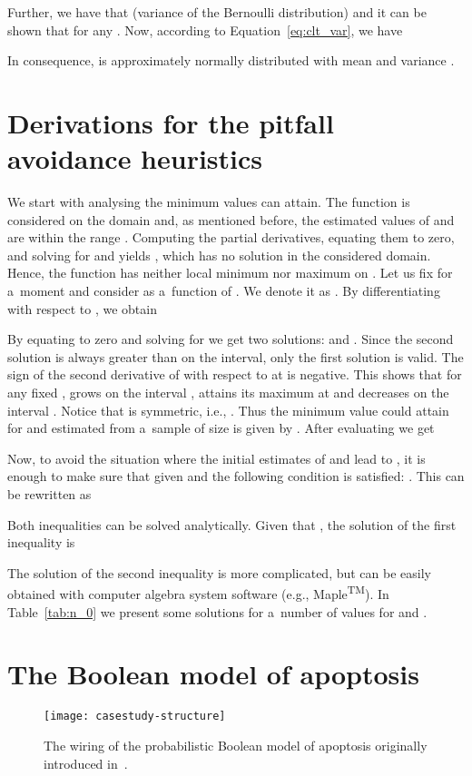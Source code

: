 \documentclass[runningheads,a4paper]{llncs}
\begin{document}
Further, we have that
 (variance of the
Bernoulli distribution) and it can be shown that
 for any . Now,
according to Equation~\eqref{eq:clt_var}, we have

In consequence,  is approximately normally distributed with mean
 and variance
.

\section{Derivations for the pitfall avoidance heuristics}
\label{app:1st_approach}

We start with analysing the minimum values  can attain. The function is considered
on the domain  and, as mentioned before, the estimated values of  and
 are within the range . Computing the partial derivatives, equating them
to zero, and solving for  and  yields , which has no solution in
the considered domain. Hence, the function has neither local minimum nor maximum on . Let us
fix  for a~moment and consider  as a~function of .
We denote it as .
By differentiating with respect to , we obtain

By equating to zero and solving for  we get two solutions:
 and
.
Since the second solution is always greater than  on the  interval, only the first
solution is valid. The sign of the second derivative of  with respect to 
at  is negative. This shows that for any fixed ,  grows on the
interval , attains its maximum at  and decreases on the
interval . Notice that  is symmetric, i.e., .
Thus the minimum value  could attain for  and  estimated from
a~sample of size  is given by
.
After evaluating  we get

Now, to avoid the situation where the initial estimates of  and  lead to
, it is enough to make sure that given  and  the following condition
is satisfied:
.
This can be rewritten as

Both inequalities can be solved analytically. Given that , the solution of the first
inequality is

The solution of the second inequality is more complicated, but can be easily obtained with
computer algebra system software (e.g., Maple\textsuperscript{\tiny TM}). In Table~\ref{tab:n_0}
we present some solutions for a~number of values for  and .

\newpage

\section{The Boolean model of apoptosis}
\label{app:apoptosis_model}

\begin{figure}[!h]
\centering
\texttt{[image: casestudy-structure]}
\caption{The wiring of the probabilistic Boolean model of apoptosis originally introduced
in~\cite{TMPTS14}.}
\label{fig:structure}
\end{figure}
\end{document}
